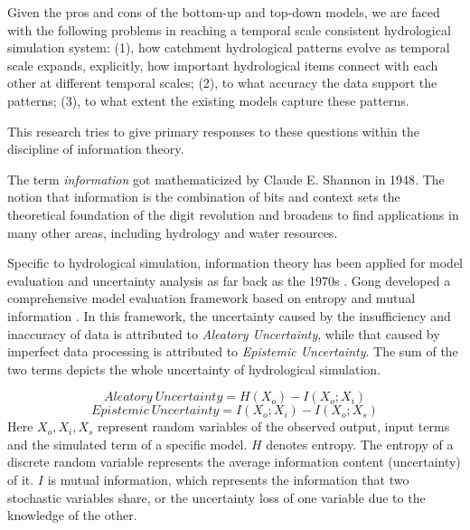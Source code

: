 \documentclass[draft,wrr]{AGUTeX}
\begin{document}
\begin{article}
Given the pros and cons of the bottom-up and top-down models, we are faced with the following problems in reaching a temporal scale consistent hydrological simulation system: (1), how catchment hydrological patterns evolve as temporal scale expands, explicitly, how important hydrological items connect with each other at different temporal scales; (2), to what accuracy the data support the patterns; (3), to what extent the existing models capture these patterns.

This research tries to give primary responses to these questions within the discipline of information theory.



The term \emph{information} got mathematicized  by Claude E. Shannon in 1948\citep{shannon2001mathematical}. The notion that information is the combination of bits and context\citep{bryant2003computer} sets the theoretical foundation of the digit revolution and   broadens to find applications in many other areas, including hydrology and water resources\citep{singh1997use,singh2000entropy,singh2013entropy}. 
 

Specific to hydrological simulation,
information theory has been applied for model evaluation and
uncertainty analysis as far back as the 1970s \citep{amorocho1973entropy,chapman1986entropy,abebe2003managing,pokhrel2010use,weijs2010hydrological,weijs2011accounting}
.
Gong developed a comprehensive model evaluation framework based on  entropy  and  mutual information  \citep{gong2013estimating} . In this framework, the uncertainty caused by the insufficiency and inaccuracy of data is attributed to \emph{Aleatory Uncertainty}, while that caused by imperfect data processing is attributed to \emph{Epistemic Uncertainty}. The sum of the two terms depicts the whole uncertainty of hydrological simulation.

\begin{equation}\label{AU}
Aleatory~Uncertainty= H(X_{o})-I(X_{o};X_{i})
\end{equation}
\begin{equation}\label{EU}
Epistemic~Uncertainty=I(X_{o};X_{i})-I(X_{o};X_{s})
\end{equation}
Here $X_o,X_i,X_s$ represent random variables of the observed output, input terms and the simulated term of a specific model. $H$ denotes entropy. The entropy of a discrete random variable represents the average information content (uncertainty) of it. $I$ is  mutual information, which represents the  information that two stochastic variables share, or the uncertainty loss of one variable due to the knowledge of the other.  


\end{article}
\end{document}
